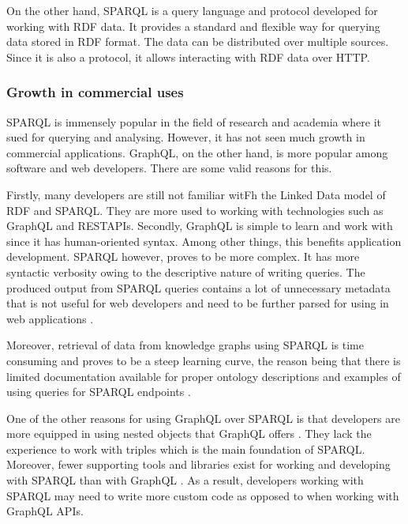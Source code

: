 On the other hand, SPARQL is a query language and protocol developed for working with RDF data. It provides a standard and flexible way for querying data stored in RDF format. The data can be distributed over multiple sources. Since it is also a protocol, it allows interacting with RDF data over HTTP. 
 
\subsubsection*{Growth in commercial uses}
SPARQL is immensely popular in the field of research and academia where it sued for querying and analysing. However, it has not seen much growth in commercial applications. GraphQL, on the other hand, is more popular among software and web developers. There are some valid reasons for this.

Firstly, many developers are still not familiar witFh the Linked Data model of RDF and SPARQL. They are more used to working with technologies such as GraphQL and RESTAPIs. Secondly, GraphQL is simple to learn and work with since it has human-oriented syntax. Among other things, this benefits application development. SPARQL however, proves to be more complex. It has more syntactic verbosity owing to the descriptive nature of writing queries. The produced output from SPARQL queries contains a lot of unnecessary metadata that is not useful for web developers and need to be further parsed for using in web applications \cite{Lisena2018}. 

Moreover, retrieval of data from knowledge graphs using SPARQL is time consuming and proves to be a steep learning curve, the reason being that there is limited documentation available for proper ontology descriptions and examples of using queries for SPARQL endpoints \cite{Angele2022}.

One of the other reasons for using GraphQL over SPARQL is that developers are more equipped in using nested objects that GraphQL offers \cite{Taelman2018}. They lack the experience to work with triples which is the main foundation of SPARQL. Moreover, fewer supporting tools and libraries exist for working and developing with SPARQL than with GraphQL \cite{Taelman2018}. As a result, developers working with SPARQL may need to write more custom code as opposed to when working with GraphQL APIs.


